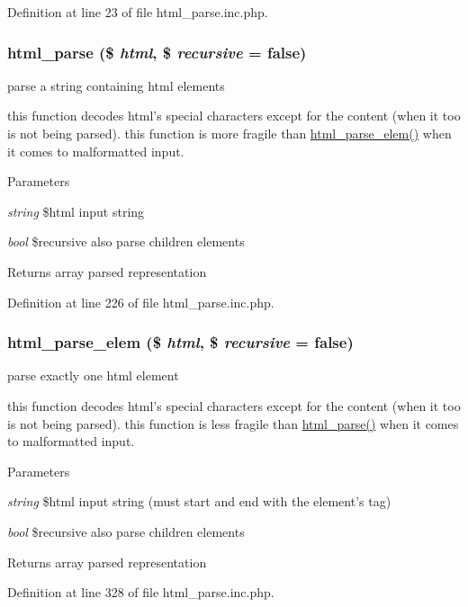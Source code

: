Definition at line 23 of file html\_\-parse.inc.php.

\hypertarget{html__parse_8inc_8php_a1003b146f08aef5a3a78d75a3538a4d7}{
\subsubsection[{html\_\-parse}]{\setlength{\rightskip}{0pt plus 5cm}html\_\-parse (\$ {\em html}, \/  \$ {\em recursive} = {\ttfamily false})}}
\label{html__parse_8inc_8php_a1003b146f08aef5a3a78d75a3538a4d7}
parse a string containing html elements

this function decodes html's special characters except for the content (when it too is not being parsed). this function is more fragile than \hyperlink{html__parse_8inc_8php_a6d9c21ee610953fb5b5b64fae3f74ed3}{html\_\-parse\_\-elem()} when it comes to malformatted input. 
\begin{DoxyParams}{Parameters}
\item[{\em string}]\$html input string \item[{\em bool}]\$recursive also parse children elements \end{DoxyParams}
\begin{DoxyReturn}{Returns}
array parsed representation 
\end{DoxyReturn}


Definition at line 226 of file html\_\-parse.inc.php.

\hypertarget{html__parse_8inc_8php_a6d9c21ee610953fb5b5b64fae3f74ed3}{
\subsubsection[{html\_\-parse\_\-elem}]{\setlength{\rightskip}{0pt plus 5cm}html\_\-parse\_\-elem (\$ {\em html}, \/  \$ {\em recursive} = {\ttfamily false})}}
\label{html__parse_8inc_8php_a6d9c21ee610953fb5b5b64fae3f74ed3}
parse exactly one html element

this function decodes html's special characters except for the content (when it too is not being parsed). this function is less fragile than \hyperlink{html__parse_8inc_8php_a1003b146f08aef5a3a78d75a3538a4d7}{html\_\-parse()} when it comes to malformatted input. 
\begin{DoxyParams}{Parameters}
\item[{\em string}]\$html input string (must start and end with the element's tag) \item[{\em bool}]\$recursive also parse children elements \end{DoxyParams}
\begin{DoxyReturn}{Returns}
array parsed representation 
\end{DoxyReturn}


Definition at line 328 of file html\_\-parse.inc.php.

